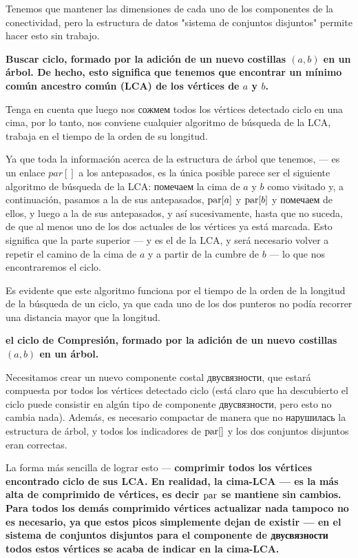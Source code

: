 {Tenemos que mantener las dimensiones de cada uno de los componentes de la conectividad, pero la estructura de datos "sistema de conjuntos disjuntos" permite hacer esto sin trabajo.

\li \bf{Buscar ciclo}, formado por la adición de un nuevo costillas $(a,b)$ en un árbol. De hecho, esto significa que tenemos que encontrar un mínimo común ancestro común (LCA) de los vértices de $a$ y $b$.

Tenga en cuenta que luego nos сожмем todos los vértices detectado ciclo en una cima, por lo tanto, nos conviene cualquier algoritmo de búsqueda de la LCA, trabaja en el tiempo de la orden de su longitud.

Ya que toda la información acerca de la estructura de árbol que tenemos, --- es un enlace $par[]$ a los antepasados, es la única posible parece ser el siguiente algoritmo de búsqueda de la LCA: помечаем la cima de $a$ y $b$ como visitado y, a continuación, pasamos a la de sus antepasados, ${\rm par}[a]$ y ${\rm par}[b]$ y помечаем de ellos, y luego a la de sus antepasados, y así sucesivamente, hasta que no suceda, de que al menos uno de los dos actuales de los vértices ya está marcada. Esto significa que la parte superior --- y es el de la LCA, y será necesario volver a repetir el camino de la cima de $a$ y a partir de la cumbre de $b$ --- lo que nos encontraremos el ciclo.

Es evidente que este algoritmo funciona por el tiempo de la orden de la longitud de la búsqueda de un ciclo, ya que cada uno de los dos punteros no podía recorrer una distancia mayor que la longitud.

\li \bf{el ciclo de Compresión}, formado por la adición de un nuevo costillas $(a,b)$ en un árbol.

Necesitamos crear un nuevo componente costal двусвязности, que estará compuesta por todos los vértices detectado ciclo (está claro que ha descubierto el ciclo puede consistir en algún tipo de componente двусвязности, pero esto no cambia nada). Además, es necesario compactar de manera que no нарушилась la estructura de árbol, y todos los indicadores de ${\rm par}[]$ y los dos conjuntos disjuntos eran correctas.

La forma más sencilla de lograr esto --- \bf{comprimir todos los vértices encontrado ciclo de sus LCA}. En realidad, la cima-LCA --- es la más alta de comprimido de vértices, es decir ${\rm par}$ se mantiene sin cambios. Para todos los demás comprimido vértices actualizar nada tampoco no es necesario, ya que estos picos simplemente dejan de existir --- en el sistema de conjuntos disjuntos para el componente de двусвязности todos estos vértices se acaba de indicar en la cima-LCA.

}
